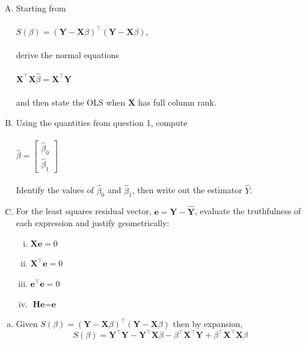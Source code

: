 \documentclass[12pt,letterpaper, onecolumn]{exam}
\begin{document}
\begin{questions}
    \begin{enumerate}[A.)]
        \item Starting from \\ \\
        $S(\beta)=(\textbf{Y}-\textbf{X}\beta)^\intercal(\textbf{Y}-\textbf{X}\beta)$, \\ \\
        derive the normal equations \\ \\
        $\textbf{X}^\intercal \textbf{X}\hat\beta = \textbf{X}^\intercal \textbf{Y}$ \\ \\
        and then state the OLS when $\textbf{X}$ has full column rank.
        \item Using the quantities from question 1, compute \\ \\
        $\hat\beta = \left[ \begin{array}{c}
             \hat\beta_0  \\ \hat\beta_1
        \end{array}\right]$ \\ \\
        Identify the values of $\hat\beta_0$ and $\hat\beta_1$, then write out the estimator $\hat Y$.
        \item For the least squares residual vector, $\textbf{e}=\textbf{Y}-\hat{\textbf{Y}}$, evaluate the truthfulness of each expression and justify geometrically: \begin{enumerate}[i.)]
            \item $\textbf{X}\textbf{e}=0$
            \item $\textbf{X}^\intercal \textbf{e}=0$
            \item $\textbf{e}^\intercal \textbf{e}=0$
            \item $\textbf{H}\textbf{e}=\textbf{e}$
        \end{enumerate}
    \end{enumerate}
    
    \begin{solution}

        \begin{enumerate}[a.)]
            \item Given $S(\beta)=(\textbf{Y}-\textbf{X}\beta)^\intercal(\textbf{Y}-\textbf{X}\beta)$ then by expansion,
            \begin{equation*}
                S(\beta) = \textbf{Y}^\intercal \textbf{Y} - \textbf{Y}^\intercal \textbf{X}\beta - \beta^\intercal \textbf{X}^\intercal\textbf{Y} + \beta^\intercal \textbf{X}^\intercal \textbf{X}\beta
            \end{equation*}


\end{enumerate}
\end{solution}
\end{questions}
\end{document}
